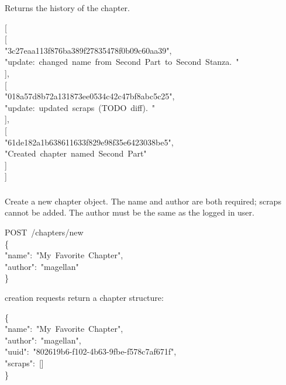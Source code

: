 \documentclass[onecolumn, draftclsnofoot, 10pt, compsoc]{IEEEtran}
\begin{document}
\noindent Returns the history of the chapter.%
\begin{mdpre}%
\noindent{}[\\
[\\
"3c27eaa113f876ba389f27835478f0b09c60aa39",\\
"update:~changed~name~from~Second~Part~to~Second~Stanza.~"\\
],\\
[\\
"018a57d8b72a131873ee0534c42c47bf8abc5c25",\\
"update:~updated~scraps~(TODO~diff).~"\\
],\\
[\\
"61de182a1b638611633f829e98f35e6423038be5",\\
"Created~chapter~named~Second~Part"\\
]\\
]%
\end{mdpre}
\subsubsection{}\label{sec-post-chaptersnew}%

\noindent Create a new chapter object. The name and author are both required; scraps
cannot be added. The author must be the same as the logged in user.%
\begin{mdpre}%
\noindent POST~/chapters/new\\
\{\\
"name":~"My~Favorite~Chapter",\\
"author":~"magellan"\\
\}%
\end{mdpre}\noindent{} creation requests return a chapter structure:
\begin{mdpre}%
\noindent\{\\
"name":~"My~Favorite~Chapter",\\
"author":~"magellan",\\
"uuid":~"802619b6-f102-4b63-9fbe-f578c7af671f",\\
"scraps":~{}[]\\
\}%
\end{mdpre}
\subsection{}\label{sec-scraps}%
\end{document}
